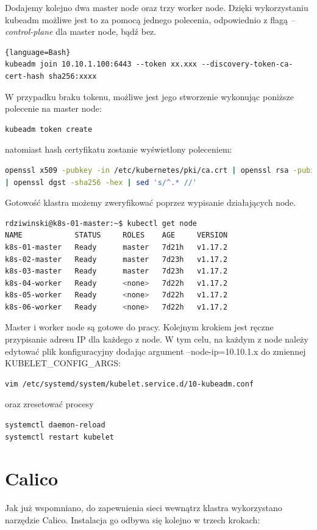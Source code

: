 \documentclass[pl,final,oneside]{mgr} %
\begin{document}
Dodajemy kolejno dwa master node oraz trzy worker node. Dzięki wykorzystaniu kubeadm możliwe jest to za pomocą jednego polecenia, odpowiednio z flagą \textit{--control-plane} dla master node, bądź bez.
\begin{lstlisting}{language=Bash}
kubeadm join 10.10.1.100:6443 --token xx.xxx --discovery-token-ca-cert-hash sha256:xxxx
\end{lstlisting}
W przypadku braku tokenu, możliwe jest jego stworzenie wykonując poniższe polecenie na master node:
\begin{lstlisting}[language=Bash]
kubeadm token create
\end{lstlisting}
natomiast hash certyfikatu zostanie wyświetlony poleceniem:
\begin{lstlisting}[language=Bash]
openssl x509 -pubkey -in /etc/kubernetes/pki/ca.crt | openssl rsa -pubin -outform der 2>/dev/null \
| openssl dgst -sha256 -hex | sed 's/^.* //'
\end{lstlisting}

Gotowość klastra możemy zweryfikować poprzez wypisanie działających node.

\begin{lstlisting}[language=Bash]
rdziwinski@k8s-01-master:~$ kubectl get node
NAME            STATUS     ROLES    AGE     VERSION
k8s-01-master   Ready      master   7d21h   v1.17.2
k8s-02-master   Ready      master   7d23h   v1.17.2
k8s-03-master   Ready      master   7d23h   v1.17.2
k8s-04-worker   Ready      <none>   7d22h   v1.17.2
k8s-05-worker   Ready      <none>   7d22h   v1.17.2
k8s-06-worker   Ready      <none>   7d22h   v1.17.2

\end{lstlisting}


Master i worker node są gotowe do pracy. Kolejnym krokiem jest ręczne przypisanie adresu IP dla każdego z node. W tym celu, na każdym z node należy edytować plik konfiguracyjny dodając argument --node-ip=10.10.1.x do zmiennej KUBELET\_CONFIG\_ARGS:
\begin{lstlisting}[language=Bash]
vim /etc/systemd/system/kubelet.service.d/10-kubeadm.conf
\end{lstlisting}
oraz zresetować procesy
\begin{lstlisting}[language=Bash]
systemctl daemon-reload
systemctl restart kubelet
\end{lstlisting}

\section{Calico}
Jak już wspomniano, do zapewnienia sieci wewnątrz klastra wykorzystano narzędzie Calico. Instalacja go odbywa się kolejno w trzech krokach: 
\end{document}
